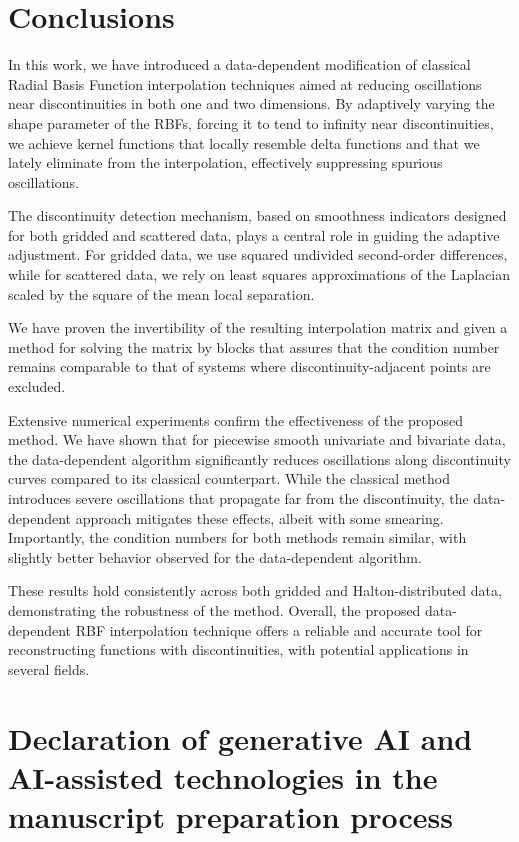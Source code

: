 \documentclass[preprint]{elsarticle}       %
\begin{document}
\section{Conclusions}
In this work, we have introduced a data-dependent modification of classical Radial Basis Function interpolation techniques aimed at reducing oscillations near discontinuities in both one and two dimensions. By adaptively varying the shape parameter of the RBFs, forcing it to tend to infinity near discontinuities, we achieve kernel functions that locally resemble delta functions and that we lately eliminate from the interpolation, effectively suppressing spurious oscillations.

The discontinuity detection mechanism, based on smoothness indicators designed for both gridded and scattered data, plays a central role in guiding the adaptive adjustment. For gridded data, we use squared undivided second-order differences, while for scattered data, we rely on least squares approximations of the Laplacian scaled by the square of the mean local separation.

We have proven the invertibility of the resulting interpolation matrix and given a method for solving the matrix by blocks that assures that the condition number remains comparable to that of systems where discontinuity-adjacent points are excluded. 

Extensive numerical experiments confirm the effectiveness of the proposed method. We have shown that for piecewise smooth univariate and bivariate data, the data-dependent algorithm significantly reduces oscillations along discontinuity curves compared to its classical counterpart. While the classical method introduces severe oscillations that propagate far from the discontinuity, the data-dependent approach mitigates these effects, albeit with some smearing. Importantly, the condition numbers for both methods remain similar, with slightly better behavior observed for the data-dependent algorithm.

These results hold consistently across both gridded and Halton-distributed data, demonstrating the robustness of the method. Overall, the proposed data-dependent RBF interpolation technique offers a reliable and accurate tool for reconstructing functions with discontinuities, with potential applications in several fields.

\section*{ Declaration of generative AI and AI-assisted technologies in the manuscript preparation process}
\end{document}
